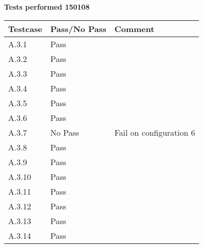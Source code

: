 \renewcommand{\testdate}{150108}
\textbf{ Tests performed \testdate}
\begin{center}
  	\begin{tabular}{| p{3cm} | p{5cm} | p{5cm} |}
    		\hline
	    	\textbf{Testcase}			& \textbf{Pass/No Pass} 	& \textbf{Comment} \\ \hline
    		A.3.1		 						& Pass 										&  				\\ \hline
    		A.3.2		 						& Pass 										& 				 \\	\hline
    		A.3.3		 						& Pass 										& 				 \\	\hline
    		A.3.4		 						& Pass 										& 				 \\	\hline
    		A.3.5		 						& Pass 										& 				 \\	\hline
    		A.3.6		 						& Pass 										& 				 \\	\hline
    		A.3.7		 						& No Pass 										& Fail on configuration 6				 \\	\hline
    		A.3.8		 						& Pass 										& 				 \\	\hline
    		A.3.9		 						& Pass 										& 				 \\	\hline
    		A.3.10	 							& Pass 										& 				 \\	\hline
    		A.3.11	 							& Pass 										& 				 \\	\hline
    		A.3.12	 							& Pass 										& 				 \\	\hline
    		A.3.13	 							& Pass 										& 				 \\	\hline
    		A.3.14	 							& Pass 										& 				 \\	\hline
 	\end{tabular}
\end{center}